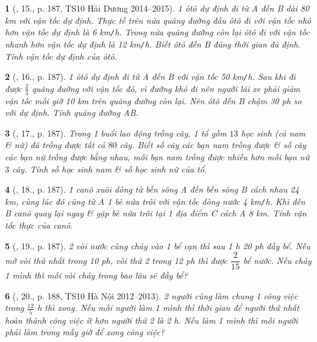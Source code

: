 \documentclass{article}
\newtheorem{baitoan}{}
\begin{document}
\begin{baitoan}[\cite{Thu_Viet_Minh_ptb2}, 15., p. 187, TS10 Hải Dương 2014--2015]
	1 ôtô dự định đi từ A đến B dài {\rm80 km} với vận tốc dự định. Thực tế trên nửa quãng đường đầu ôtô đi với vận tốc nhỏ hơn vận tốc dự định là {\rm6 km{\tt/}h}. Trong nửa quãng đường còn lại ôtô đi với vận tốc nhanh hơn vận tốc dự định là {\rm12 km{\tt/}h}. Biết ôtô đến B đúng thời gian đã định. Tính vận tốc dự định của ôtô.
\end{baitoan}

\begin{baitoan}[\cite{Thu_Viet_Minh_ptb2}, 16., p. 187]
	1 ôtô dự định đi từ A đến B với vận tốc {\rm50 km{\tt/}h}. Sau khi đi được $\frac{2}{3}$ quãng đường với vận tốc đó, vì đường khó đi nên người lái xe phải giảm vận tốc mỗi giờ {\rm10 km} trên quãng đường còn lại. Nên ôtô đến B chậm {\rm30 ph} so với dự định. Tính quãng đường AB.
\end{baitoan}

\begin{baitoan}[\cite{Thu_Viet_Minh_ptb2}, 17., p. 187]
	Trong 1 buổi lao động trồng cây, 1 tổ gồm $13$ học sinh (cả nam \& nữ) đã trồng được tất cả $80$ cây. Biết số cây các bạn nam trồng  được \& số cây các bạn nữ trồng được bằng nhau, mỗi bạn nam trồng được nhiều hơn mỗi bạn nữ $3$ cây. Tính số học sinh nam \& số học sinh nữ của tổ.
\end{baitoan}

\begin{baitoan}[\cite{Thu_Viet_Minh_ptb2}, 18., p. 187]
	1 canô xuôi dòng từ bến sông A đến bến sông B cách nhau {\rm24 km}, cùng lúc đó cũng từ A 1 bè nứa trôi với vận tốc dòng nước {\rm4 km{\tt/}h}. Khi đến B canô quay lại ngay \& gặp bè nữa trôi tại 1 địa điểm C cách A {\rm8 km}. Tính vận tốc thực của canô.
\end{baitoan}

\begin{baitoan}[\cite{Thu_Viet_Minh_ptb2}, 19., p. 187]
	2 vòi nước cùng chảy vào 1 bể cạn thì sau {\rm1 h 20 ph} đầy bể. Nếu mở vòi thứ nhất trong {\rm10 ph}, vòi thứ 2 trong {\rm12 ph} thì được $\dfrac{2}{15}$ bể nước. Nếu chảy 1 mình thì mỗi vòi chảy trong bao lâu sẽ đầy bể?
\end{baitoan}

\begin{baitoan}[\cite{Thu_Viet_Minh_ptb2}, 20., p. 188, TS10 Hà Nội 2012--2013]
	2 người cùng làm chung 1 công việc trong $\frac{12}{5}$ {\rm h} thì xong. Nếu mỗi người làm 1 mình thì thời gian để người thứ nhất hoàn thành công việc ít hơn người thứ 2 là {\rm2 h}. Nếu làm 1 mình thì mỗi người phải làm trong mấy giờ để xong công việc?
\end{baitoan}
\end{document}
